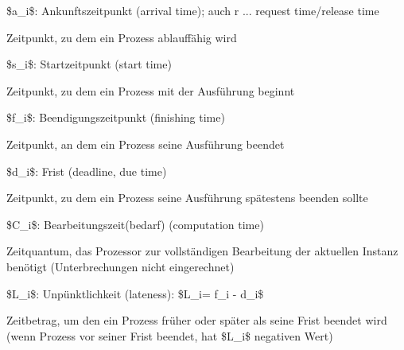 \documentclass[a4paper]{article}
\begin{document}
\begin{multicols}{3}
    \begin{itemize*}
        \item
        \item
        \$a\_i\$: Ankunftszeitpunkt (arrival time); auch r ... request
        time/release time
        \begin{itemize*}
            \item Zeitpunkt, zu dem ein Prozess ablauffähig wird
        \end{itemize*}
        \item
        \$s\_i\$: Startzeitpunkt (start time)
        \begin{itemize*}
            \item Zeitpunkt, zu dem ein Prozess mit der Ausführung beginnt
        \end{itemize*}
        \item
        \$f\_i\$: Beendigungszeitpunkt (finishing time)
        \begin{itemize*}
            \item Zeitpunkt, an dem ein Prozess seine Ausführung beendet
        \end{itemize*}
        \item
        \$d\_i\$: Frist (deadline, due time)
        \begin{itemize*}
            \item Zeitpunkt, zu dem ein Prozess seine Ausführung spätestens beenden sollte
        \end{itemize*}
        \item
        \$C\_i\$: Bearbeitungszeit(bedarf) (computation time)
        \begin{itemize*}
            \item Zeitquantum, das Prozessor zur vollständigen Bearbeitung der aktuellen Instanz benötigt (Unterbrechungen nicht eingerechnet)
        \end{itemize*}
        \item
        \item
        \$L\_i\$: Unpünktlichkeit (lateness): \$L\_i= f\_i - d\_i\$
        \begin{itemize*}
            \item Zeitbetrag, um den ein Prozess früher oder später als seine Frist beendet wird (wenn Prozess vor seiner Frist beendet, hat \$L\_i\$ negativen Wert)

\end{itemize*}
\end{itemize*}
\end{multicols}
\end{document}
